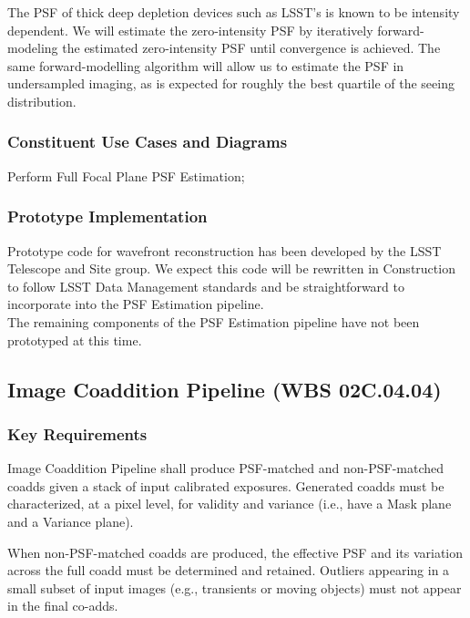 \documentclass[12pt]{article}
\newcommand{\wbsCoadd}{WBS 02C.04.04}
\begin{document}
The PSF of thick deep depletion devices such as LSST's is known to be intensity dependent. We will estimate the zero-intensity PSF by iteratively forward-modeling the estimated zero-intensity PSF until convergence is achieved. The same forward-modelling algorithm will allow us to estimate the PSF in undersampled imaging, as is expected for roughly the best quartile of the seeing distribution.

\subsubsection{Constituent Use Cases and Diagrams}

Perform Full Focal Plane PSF Estimation;

\subsubsection{Prototype Implementation}

Prototype code for wavefront reconstruction has been developed by the LSST Telescope and Site group. We expect this code will be rewritten in Construction to follow LSST Data Management standards and be straightforward to incorporate into the PSF Estimation pipeline.
\\

The remaining components of the PSF Estimation pipeline have not been prototyped at this time.

\clearpage

\subsection{Image Coaddition Pipeline (\wbsCoadd)}

\subsubsection{Key Requirements}

Image Coaddition Pipeline shall produce PSF-matched and non-PSF-matched coadds given a stack of input calibrated exposures. Generated coadds must be characterized, at a pixel level, for validity and variance (i.e., have a Mask plane and a Variance plane).

When non-PSF-matched coadds are produced, the effective PSF and its variation across the full coadd must be determined and retained. Outliers appearing in a small subset of input images (e.g., transients or moving objects) must not appear in the final co-adds. %
\end{document}

